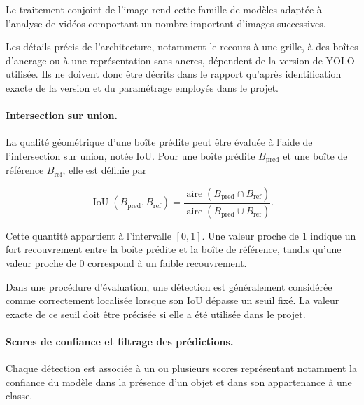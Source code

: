 \documentclass[11pt,a4paper]{report}
\begin{document}
Le traitement conjoint de l'image rend cette famille de modèles adaptée à
l'analyse de vidéos comportant un nombre important d'images successives.

Les détails précis de l'architecture, notamment le recours à une grille, à des
boîtes d'ancrage ou à une représentation sans ancres, dépendent de la version
de YOLO utilisée. Ils ne doivent donc être décrits dans le rapport qu'après
identification exacte de la version et du paramétrage employés dans le projet.

\paragraph{Intersection sur union.}

La qualité géométrique d'une boîte prédite peut être évaluée à l'aide de
l'intersection sur union, notée IoU. Pour une boîte prédite
$B_{\mathrm{pred}}$ et une boîte de référence $B_{\mathrm{ref}}$, elle est
définie par

\begin{equation}
    \operatorname{IoU}
    \left(
        B_{\mathrm{pred}},
        B_{\mathrm{ref}}
    \right)
    =
    \frac{
        \operatorname{aire}
        \left(
            B_{\mathrm{pred}}
            \cap
            B_{\mathrm{ref}}
        \right)
    }{
        \operatorname{aire}
        \left(
            B_{\mathrm{pred}}
            \cup
            B_{\mathrm{ref}}
        \right)
    }.
    \label{eq:iou}
\end{equation}

Cette quantité appartient à l'intervalle $[0,1]$. Une valeur proche de $1$
indique un fort recouvrement entre la boîte prédite et la boîte de référence,
tandis qu'une valeur proche de $0$ correspond à un faible recouvrement.

Dans une procédure d'évaluation, une détection est généralement considérée
comme correctement localisée lorsque son IoU dépasse un seuil fixé. La valeur
exacte de ce seuil doit être précisée si elle a été utilisée dans le projet.

\paragraph{Scores de confiance et filtrage des prédictions.}

Chaque détection est associée à un ou plusieurs scores représentant notamment
la confiance du modèle dans la présence d'un objet et dans son appartenance à
une classe.
\end{document}
